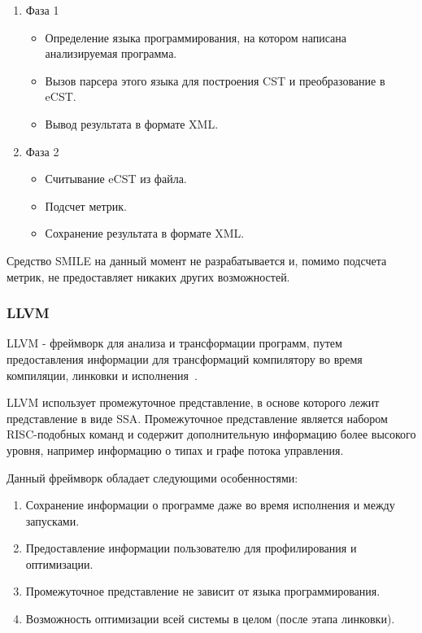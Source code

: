 \begin{enumerate}
    \item Фаза 1
    \begin{itemize}
        \item Определение языка программирования, на котором написана
        анализируемая программа.
        \item Вызов парсера этого языка для построения CST и преобразование в
        eCST.
        \item Вывод результата в формате XML.
    \end{itemize}

    \item Фаза 2
    \begin{itemize}
        \item Считывание eCST из файла.
        \item Подсчет метрик.
        \item Сохранение результата в формате XML.
    \end{itemize}
\end{enumerate}

Средство SMILE на данный момент не разрабатывается и, помимо подсчета метрик, не
предоставляет никаких других возможностей.

\subsubsection{LLVM}

LLVM - фреймворк для анализа и трансформации программ, путем предоставления
информации для трансформаций компилятору во время компиляции, линковки и
исполнения~\cite{llvm}.

LLVM использует промежуточное представление, в основе которого лежит
представление в виде SSA. Промежуточное представление является набором
RISC-подобных команд и содержит дополнительную информацию более высокого уровня,
например информацию о типах и графе потока управления.

Данный фреймворк обладает следующими особенностями:

\begin{enumerate}
    \item Сохранение информации о программе даже во время исполнения и между
    запусками.
    \item Предоставление информации пользователю для профилирования и
    оптимизации.
    \item Промежуточное представление не зависит от языка программирования.
    \item Возможность оптимизации всей системы в целом (после этапа линковки).
\end{enumerate}

